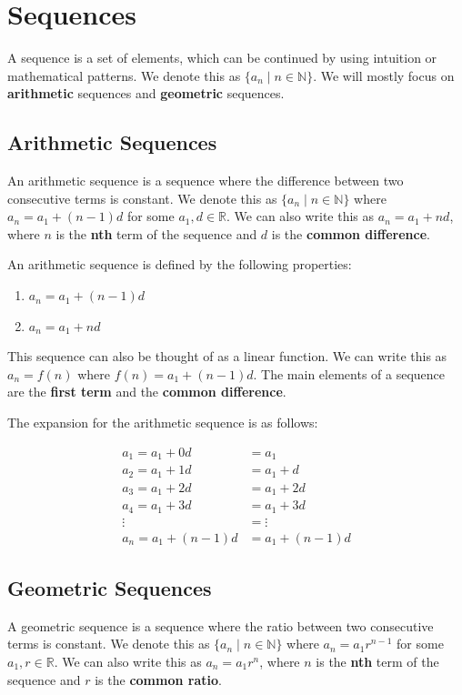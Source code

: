 \documentclass[11pt]{article}
\begin{document}
\section{Sequences}
\label{sec:orgd4ef528}

A sequence is a set of elements, which can be continued by using intuition or mathematical patterns. We denote this as \(\{a_n \mid n \in \mathbb{N}\}\). We will mostly focus on \textbf{arithmetic} sequences and \textbf{geometric} sequences.

\subsection{Arithmetic Sequences}
\label{sec:orge44db40}
An arithmetic sequence is a sequence where the difference between two consecutive terms is constant. We denote this as \(\{a_n \mid n \in \mathbb{N}\}\) where \(a_n = a_1 + (n-1)d\) for some \(a_1, d \in \mathbb{R}\). We can also write this as \(a_n = a_1 + nd\), where \(n\) is the \textbf{nth} term of the sequence and \(d\) is the \textbf{common difference}.

An arithmetic sequence is defined by the following properties:
\begin{enumerate}
\item \(a_n = a_1 + (n-1)d\)
\item \(a_n = a_1 + nd\)
\end{enumerate}

This sequence can also be thought of as a linear function. We can write this as \(a_n = f(n)\) where \(f(n) = a_1 + (n-1)d\). The main elements of a sequence are the \textbf{first term} and the \textbf{common difference}.

The expansion for the arithmetic sequence is as follows:

\begin{align}
a_1 = a_1 + 0d &= a_1 \\
a_2 = a_1 + 1d &= a_1 + d \\
a_3 = a_1 + 2d &= a_1 + 2d \\
a_4 = a_1 + 3d &= a_1 + 3d \\
\vdots &= \vdots \\
a_n = a_1 + (n-1)d &= a_1 + (n-1)d
\end{align}

\subsection{Geometric Sequences}
\label{sec:orgcab0ed1}
A geometric sequence is a sequence where the ratio between two consecutive terms is constant. We denote this as \(\{a_n \mid n \in \mathbb{N}\}\) where \(a_n = a_1 r^{n-1}\) for some \(a_1, r \in \mathbb{R}\). We can also write this as \(a_n = a_1 r^n\), where \(n\) is the \textbf{nth} term of the sequence and \(r\) is the \textbf{common ratio}.
\end{document}
